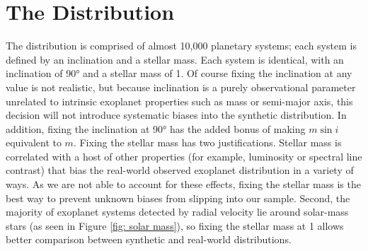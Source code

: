 \documentclass[12pt,manuscript]{aastex}
\begin{document}

\FloatBarrier
\section{The Distribution}
\label{section: distribution}

The distribution is comprised of almost 10,000 planetary systems; each system is defined by an inclination and a stellar mass. 
Each system is identical, with an inclination of \ang{90} and a stellar mass of \SI{1}{\Msun}.
Of course fixing the inclination at any value is not realistic,
but because inclination is a purely observational parameter unrelated to intrinsic exoplanet properties such as mass or semi-major axis, this decision will not introduce systematic biases into the synthetic distribution.
In addition, fixing the inclination at \ang{90} has the added bonus of making $m \sin i$ equivalent to $m$.
Fixing the stellar mass has two justifications.
Stellar mass is correlated with a host of other properties (for example, luminosity or spectral line contrast) that bias the real-world observed exoplanet distribution in a variety of ways. 
As we are not able to account for these effects, fixing the stellar mass is the best way to prevent unknown biases from slipping into our sample. 
Second, the majority of exoplanet systems detected by radial velocity lie around solar-mass stars (as seen in Figure \ref{fig: solar mass}), so fixing the stellar mass at \SI{1}{\Msun} allows better comparison between synthetic and real-world distributions.
\end{document}
